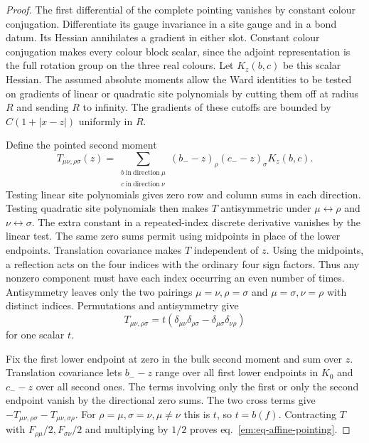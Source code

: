 \documentclass[11pt,letterpaper,reqno]{amsart}
\numberwithin{equation}{section}
\renewcommand{\eqref}[1]{\textup{eq.~\ref{#1}}}
\theoremstyle{definition}
\theoremstyle{remark}
\begin{document}
\begin{proof}
The first differential of the complete pointing vanishes by constant
colour conjugation. Differentiate its gauge invariance in a site
gauge and in a bond datum. Its Hessian annihilates a gradient in
either slot. Constant colour conjugation makes every colour block
scalar, since the adjoint representation is the full rotation
group on the three real colours. Let \(K_z(b,c)\) be this scalar
Hessian. The assumed absolute moments allow the Ward identities to
be tested on
gradients of linear or quadratic site polynomials by cutting them
off at radius \(R\) and sending \(R\) to infinity. The gradients
of these cutoffs are bounded by \(C(1+|x-z|)\) uniformly in \(R\).

Define the pointed second moment
\[
 T_{\mu\nu,\rho\sigma}(z)
  =\sum_{\substack{b\ \mathrm{in\ direction}\ \mu\\
                   c\ \mathrm{in\ direction}\ \nu}}
      (b_--z)_\rho(c_--z)_\sigma K_z(b,c).
\]
Testing linear site polynomials gives zero row and column sums
in each direction. Testing quadratic site polynomials then makes
\(T\) antisymmetric under \(\mu\leftrightarrow\rho\) and
\(\nu\leftrightarrow\sigma\). The extra constant in a repeated-index
discrete derivative vanishes by the linear test. The same zero sums
permit using midpoints in place of the lower endpoints. Translation
covariance makes \(T\) independent of \(z\). Using the midpoints,
a reflection acts on the four indices with the ordinary four sign
factors. Thus any nonzero component must have each index occurring
an even number of times. Antisymmetry leaves only the two pairings
\(\mu=\nu,\rho=\sigma\) and \(\mu=\sigma,\nu=\rho\) with distinct
indices. Permutations and antisymmetry give
\[
 T_{\mu\nu,\rho\sigma}
       =t(\delta_{\mu\nu}\delta_{\rho\sigma}
                  -\delta_{\mu\sigma}\delta_{\nu\rho})
\]
for one scalar \(t\).

Fix the first lower endpoint at zero in the bulk second moment and
sum over \(z\). Translation covariance lets \(b_--z\) range over
all first lower endpoints in \(K_0\) and \(c_--z\) over all second
ones. The terms involving only the first or only the second endpoint
vanish by the directional zero sums. The two cross terms give
\(-T_{\mu\nu,\rho\sigma}-T_{\mu\nu,\sigma\rho}\). For
\(\rho=\mu,\sigma=\nu,\mu\ne\nu\) this is \(t\), so \(t=b(f)\).
Contracting \(T\) with \(F_{\rho\mu}/2,F_{\sigma\nu}/2\)
and multiplying by \(1/2\) proves \eqref{em:eq-affine-pointing}.
\end{proof}
\end{document}
